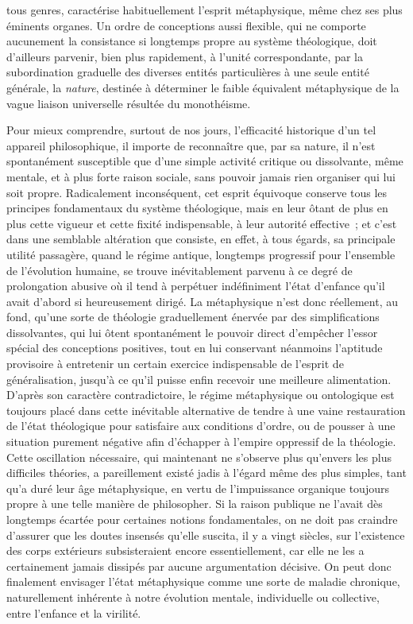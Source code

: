 \documentclass[french,twoside]{book} %
\begin{document}
tous genres, caractérise habituellement l’esprit métaphysique, même chez ses plus éminents organes. Un ordre de conceptions aussi flexible, qui ne comporte aucunement la consistance si longtemps propre au système théologique, doit d’ailleurs parvenir, bien plus rapidement, à l’unité correspondante, par la subordination graduelle des diverses entités particulières à une seule entité générale, la {\itshape nature}, destinée à déterminer le faible équivalent métaphysique de la vague liaison universelle résultée du monothéisme.\par
Pour mieux comprendre, surtout de nos jours, l’efficacité historique d’un tel appareil philosophique, il importe de reconnaître que, par sa nature, il n’est spontanément susceptible que d’une simple activité critique ou dissolvante, même mentale, et à plus forte raison sociale, sans pouvoir jamais rien organiser qui lui soit propre. Radicalement inconséquent, cet esprit équivoque conserve tous les principes fondamentaux du système théologique, mais en leur ôtant de plus en plus cette vigueur et cette fixité indispensable, à leur autorité effective ; et c’est dans une semblable altération que consiste, en effet, à tous égards, sa principale utilité passagère, quand le régime antique, longtemps progressif pour l’ensemble de l’évolution humaine, se trouve inévitablement parvenu à ce degré de prolongation abusive où il tend à perpétuer indéfiniment l’état d’enfance qu’il avait d’abord si heureusement dirigé. La métaphysique n’est donc réellement, au fond, qu’une sorte de théologie graduellement énervée par des simplifications dissolvantes, qui lui ôtent spontanément le pouvoir direct d’empêcher l’essor spécial des conceptions positives, tout en lui conservant néanmoins l’aptitude provisoire à entretenir un certain exercice indispensable de l’esprit de généralisation, jusqu’à ce qu’il puisse enfin recevoir une meilleure alimentation. D’après son caractère contradictoire, le régime métaphysique ou ontologique est toujours placé dans cette inévitable alternative de tendre à une vaine restauration de l’état théologique pour satisfaire aux conditions d’ordre, ou de pousser à une situation purement négative afin d’échapper à l’empire oppressif de la théologie. Cette oscillation nécessaire, qui maintenant ne s’observe plus qu’envers les plus difficiles théories, a pareillement existé jadis à l’égard même des plus simples, tant qu’a duré leur âge métaphysique, en vertu de l’impuissance organique toujours propre à une telle manière de philosopher. Si la raison publique ne l’avait dès longtemps écartée pour certaines notions fondamentales, on ne doit pas craindre d’assurer que les doutes insensés qu’elle suscita, il y a vingt siècles, sur l’existence des corps extérieurs subsisteraient encore essentiellement, car elle ne les a certainement jamais dissipés par aucune argumentation décisive. On peut donc finalement envisager l’état métaphysique comme une sorte de maladie chronique, naturellement inhérente à notre évolution mentale, individuelle ou collective, entre l’enfance et la virilité.\par
\end{document}
